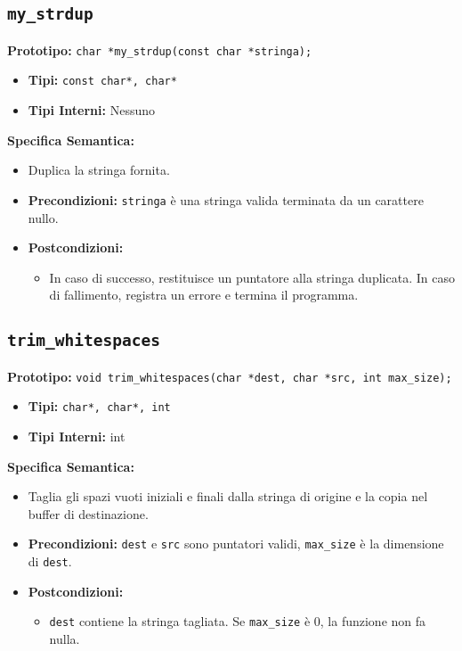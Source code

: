 \documentclass{article}
\begin{document}
\subsection{\texttt{my\_strdup}}
\textbf{Prototipo:} \texttt{char *my\_strdup(const char *stringa);}

\begin{itemize}[label=--,leftmargin=*]
    \item \textbf{Tipi:} \texttt{const char*, char*}
    \item \textbf{Tipi Interni:} Nessuno
\end{itemize}

\flushleft
\textbf{Specifica Semantica:}
\begin{itemize}[label=--,leftmargin=*]
    \item Duplica la stringa fornita.
    \item \textbf{Precondizioni:} \texttt{stringa} è una stringa valida terminata da un carattere nullo.
    \item \textbf{Postcondizioni:}
    \begin{itemize}[label=--,leftmargin=*]
        \item In caso di successo, restituisce un puntatore alla stringa duplicata. In caso di fallimento, registra un errore e termina il programma.
    \end{itemize}
\end{itemize}

\subsection{\texttt{trim\_whitespaces}}
\textbf{Prototipo:} \texttt{void trim\_whitespaces(char *dest, char *src, int max\_size);}

\begin{itemize}[label=--,leftmargin=*]
    \item \textbf{Tipi:} \texttt{char*, char*, int}
    \item \textbf{Tipi Interni:} int
\end{itemize}

\flushleft
\textbf{Specifica Semantica:}
\begin{itemize}[label=--,leftmargin=*]
    \item Taglia gli spazi vuoti iniziali e finali dalla stringa di origine e la copia nel buffer di destinazione.
    \item \textbf{Precondizioni:} \texttt{dest} e \texttt{src} sono puntatori validi, \texttt{max\_size} è la dimensione di \texttt{dest}.
    \item \textbf{Postcondizioni:}
    \begin{itemize}[label=--,leftmargin=*]
        \item \texttt{dest} contiene la stringa tagliata. Se \texttt{max\_size} è 0, la funzione non fa nulla.
    \end{itemize}
\end{itemize}
\end{document}
